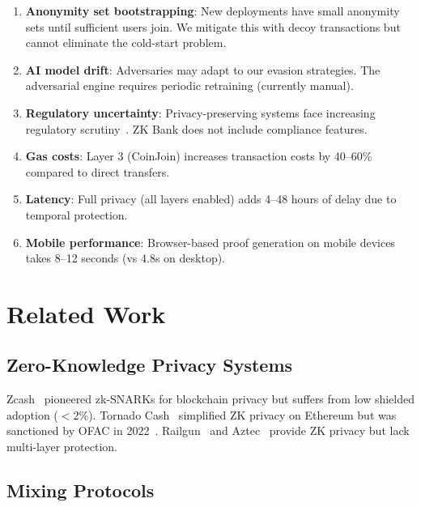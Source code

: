 \documentclass[11pt]{article}
\theoremstyle{definition}
\theoremstyle{plain}
\theoremstyle{remark}
\begin{document}
\begin{enumerate}
    \item \textbf{Anonymity set bootstrapping}: New deployments have small anonymity sets until sufficient users join. We mitigate this with decoy transactions but cannot eliminate the cold-start problem.
    
    \item \textbf{AI model drift}: Adversaries may adapt to our evasion strategies. The adversarial engine requires periodic retraining (currently manual).
    
    \item \textbf{Regulatory uncertainty}: Privacy-preserving systems face increasing regulatory scrutiny~\cite{ofac2022tornado}. ZK Bank does not include compliance features.
    
    \item \textbf{Gas costs}: Layer 3 (CoinJoin) increases transaction costs by 40--60\% compared to direct transfers.
    
    \item \textbf{Latency}: Full privacy (all layers enabled) adds 4--48 hours of delay due to temporal protection.
    
    \item \textbf{Mobile performance}: Browser-based proof generation on mobile devices takes 8--12 seconds (vs 4.8s on desktop).
\end{enumerate}

\section{Related Work}
\label{sec:related}

\subsection{Zero-Knowledge Privacy Systems}

Zcash~\cite{hopwood2016zcash} pioneered zk-SNARKs for blockchain privacy but suffers from low shielded adoption ($<$2\%). Tornado Cash~\cite{pertsev2019tornado} simplified ZK privacy on Ethereum but was sanctioned by OFAC in 2022~\cite{ofac2022tornado}. Railgun~\cite{railgun2021} and Aztec~\cite{aztec2023} provide ZK privacy but lack multi-layer protection.

\subsection{Mixing Protocols}
\end{document}
